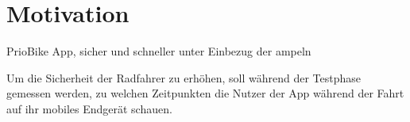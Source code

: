 \chapter{Motivation}\label{sec:Motivation}


PrioBike App, sicher und schneller unter Einbezug der ampeln

Um die Sicherheit der Radfahrer zu erhöhen, soll während der Testphase gemessen werden, zu welchen Zeitpunkten die Nutzer der App während der Fahrt auf ihr mobiles Endgerät schauen.